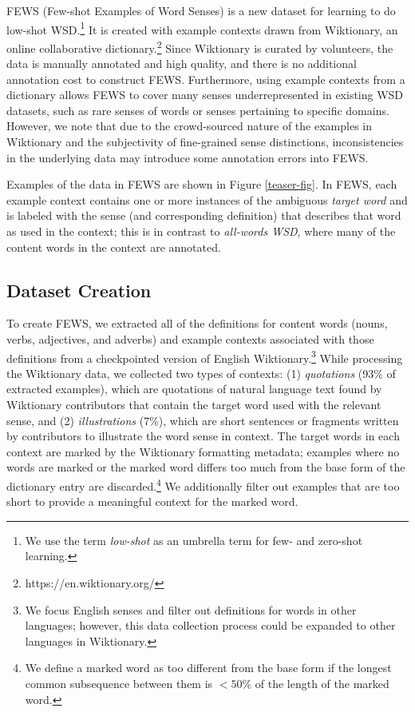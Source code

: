 \documentclass[11pt,a4paper]{article}
\begin{document}
FEWS (Few-shot Examples of Word Senses) is a new dataset for learning to do low-shot WSD.\footnote{We use the term \textit{low-shot} as an umbrella term for few- and zero-shot learning.} It is created with example contexts drawn from Wiktionary, an online collaborative dictionary.\footnote{https://en.wiktionary.org/} Since Wiktionary is curated by volunteers, the data is manually annotated and high quality, and there is no additional annotation cost to construct FEWS. Furthermore, using example contexts from a dictionary allows FEWS to cover many senses underrepresented in existing WSD datasets, such as rare senses of words or senses pertaining to specific domains. However, we note that due to the crowd-sourced nature of the examples in Wiktionary and the subjectivity of fine-grained sense distinctions, inconsistencies in the underlying data may introduce some annotation errors into FEWS.

Examples of the data in FEWS are shown in Figure \ref{teaser-fig}. In FEWS, each example context contains one or more instances of the ambiguous \textit{target word} and is labeled with the sense (and corresponding definition) that describes that word as used in the context; this is in contrast to \textit{all-words WSD}, where many of the content words in the context are annotated.

\subsection{Dataset Creation}
To create FEWS, we extracted all of the definitions for content words (nouns, verbs, adjectives, and adverbs) and example contexts associated with those definitions from a checkpointed version of English Wiktionary.\footnote{We focus English senses and filter out definitions for words in other languages; however, this data collection process could be expanded to other languages in Wiktionary.}
While processing the Wiktionary data, we collected two types of contexts: (1) \textit{quotations} (93\% of extracted examples), which are quotations of natural language text found by Wiktionary contributors that contain the target word used with the relevant sense, and (2) \textit{illustrations} (7\%), which are short sentences or fragments written by contributors to illustrate the word sense in context. The target words in each context are marked by the Wiktionary formatting metadata; examples where no words are marked or the marked word differs too much from the base form of the dictionary entry are discarded.\footnote{We define a marked word as too different from the base form if the longest common subsequence between them is $< 50\%$ of the length of the marked word.} We additionally filter out examples that are too short to provide a meaningful context for the marked word.
\end{document}
